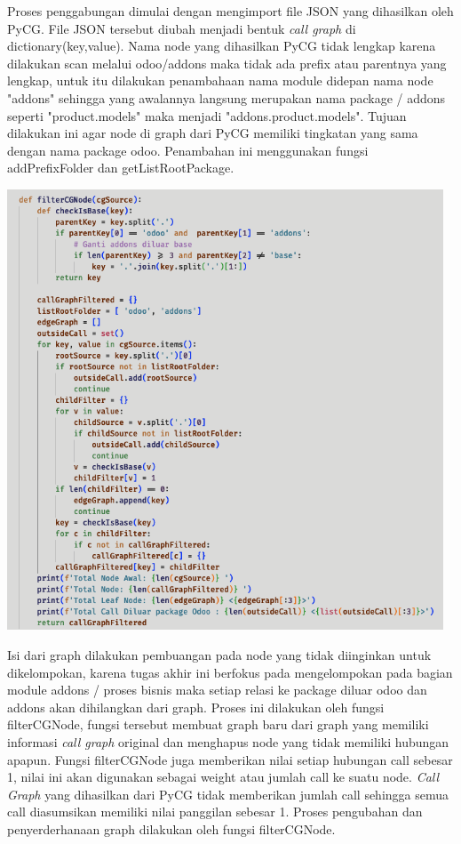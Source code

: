 Proses penggabungan dimulai dengan mengimport file JSON yang dihasilkan oleh PyCG. File JSON tersebut diubah menjadi bentuk \textit{call graph} di dictionary(key,value). Nama node yang dihasilkan PyCG tidak lengkap karena dilakukan scan melalui odoo/addons maka tidak ada prefix atau parentnya yang lengkap, untuk itu dilakukan penambahaan nama module didepan nama node "addons" sehingga yang awalannya langsung merupakan nama package / addons seperti "product.models" maka menjadi "addons.product.models". Tujuan dilakukan ini agar node di graph dari PyCG memiliki tingkatan yang sama dengan nama package odoo. Penambahan ini menggunakan fungsi addPrefixFolder dan getListRootPackage.

\begin{center}
	\includegraphics[width=13cm]{img/bab_4/ekstraksi_2.png}
	\label{fig:ekstraksi_2}
\end{center}

Isi dari graph dilakukan pembuangan pada node yang tidak diinginkan untuk dikelompokan, karena tugas akhir ini berfokus pada mengelompokan pada bagian module addons / proses bisnis maka setiap relasi ke package diluar  odoo dan addons akan dihilangkan dari graph. Proses ini dilakukan oleh fungsi filterCGNode, fungsi tersebut membuat graph baru dari graph yang memiliki informasi \textit{call graph} original dan menghapus node yang tidak memiliki hubungan apapun. Fungsi filterCGNode juga memberikan nilai setiap hubungan call sebesar 1, nilai ini akan digunakan sebagai weight atau jumlah call ke suatu node. \textit{Call Graph} yang dihasilkan dari PyCG tidak memberikan jumlah call sehingga semua call diasumsikan memiliki nilai panggilan sebesar 1. Proses pengubahan dan penyerderhanaan graph dilakukan oleh fungsi filterCGNode.

